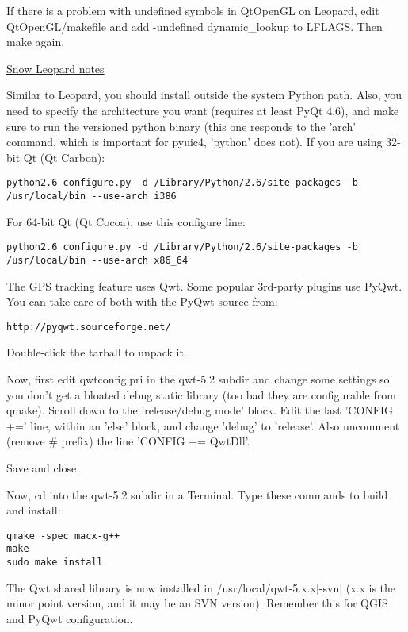 If there is a problem with undefined symbols in QtOpenGL on Leopard, edit
QtOpenGL/makefile and add -undefined dynamic\_lookup to LFLAGS.
Then make again.

\underline{Snow Leopard notes}

Similar to Leopard, you should install outside the system Python path.
Also, you need to specify the architecture you want (requires at least PyQt 4.6),
and make sure to run the versioned python binary (this one responds to the
'arch' command, which is important for pyuic4, 'python' does not).
If you are using 32-bit Qt (Qt Carbon):

\begin{verbatim}
python2.6 configure.py -d /Library/Python/2.6/site-packages -b /usr/local/bin --use-arch i386
\end{verbatim}

For 64-bit Qt (Qt Cocoa), use this configure line:

\begin{verbatim}
python2.6 configure.py -d /Library/Python/2.6/site-packages -b /usr/local/bin --use-arch x86_64
\end{verbatim}

The GPS tracking feature uses Qwt.  Some popular 3rd-party plugins use PyQwt.
You can take care of both with the PyQwt source from:

\begin{verbatim}
http://pyqwt.sourceforge.net/
\end{verbatim}

Double-click the tarball to unpack it.

Now, first edit qwtconfig.pri in the qwt-5.2 subdir and change some settings so
you don't get a bloated debug static library (too bad they are configurable from
qmake).  Scroll down to the 'release/debug mode' block.  Edit the last 'CONFIG +='
line, within an 'else' block, and change 'debug' to 'release'.  Also uncomment
(remove \# prefix) the line 'CONFIG += QwtDll'.

Save and close.

Now, cd into the qwt-5.2 subdir in a Terminal.  Type these commands to build and install:

\begin{verbatim}
qmake -spec macx-g++
make
sudo make install
\end{verbatim}

The Qwt shared library is now installed in /usr/local/qwt-5.x.x[-svn] (x.x is the 
minor.point version, and it may be an SVN version).  Remember this for QGIS and PyQwt configuration.

